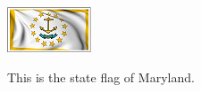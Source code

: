 \documentclass{ximera}
\begin{document}
\begin{question}
\includegraphics{pics/StateFlags/RhodeIsland.png}
\begin{multipleChoice}
\end{multipleChoice}
\begin{feedback}
This is the state flag of Maryland.
\end{feedback}
\end{question}
\end{document}
